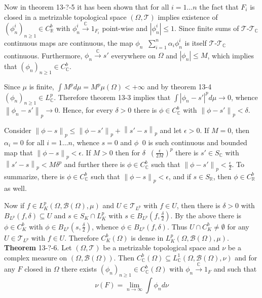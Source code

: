 \documentclass[a4paper]{article}
\newcommand{\brac}[1]{\left ( #1 \right )}
\newcommand{\abs}[1]{\left | #1 \right |}
\newcommand{\nrm}[1]{\left\| #1 \right \|}
\newcommand{\Real}{\mathbb{R}}
\newcommand{\Cplx}{\mathbb{C}}
\newcommand{\Tcal}{\mathcal{T}}
\newcommand{\borel}[1]{\mathcal{B}\brac{#1}}
\newcommand{\defn}{\mathop{\overset{\Delta}{=}}\nolimits}
\begin{document}
Now in theorem 13-?-5 it has been shown that for all $i=1\ldots n$ the fact that $F_i$ is closed in a metrizable topological space $\brac{\Omega,\Tcal}$ implies existence of $\brac{\phi^i_n}_{n\geq1}\in C^b_\Real$ with $\phi^i_n\overset{\Cplx}{\to}1_{F_i}$ point-wise and $\abs{\phi^i_n}\leq 1$. Since finite sums of $\Tcal$-$\Tcal_\Cplx$ continuous maps are continuous, the map $\phi_n\defn \sum_{i=1}^n \alpha_i \phi^i_n$ is itself $\Tcal$-$\Tcal_\Cplx$ continuous. Furthermore, $\phi_n\overset{\Cplx}{\to}s'$ everywhere on $\Omega$ and $\abs{\phi_n}\leq M$, which implies that $\brac{\phi_n}_{n\geq1}\in C^b_\Cplx$.

Since $\mu$ is finite, $\int M^p d\mu = M^p \mu\brac{\Omega}<+\infty$ and by theorem 13-4 $\brac{\phi_n}_{n\geq1}\in L^p_\Cplx$. Therefore theorem 13-3 implies that $\int \abs{\phi_n-s'}^p d\mu \to 0$, whence $\nrm{\phi_n-s'}_p\to 0$. Hence, for every $\delta>0$ there is $\phi\in C^b_\Cplx$ with $\nrm{\phi-s'}_p<\delta$.

Consider $\nrm{\phi-s}_p\leq \nrm{\phi-s'}_p+\nrm{s'-s}_p$ and let $\epsilon>0$. If $M=0$, then $\alpha_i=0$ for all $i=1\ldots n$, whence $s=0$ and $\phi\defn 0$ is such continuous and bounded map that $\nrm{\phi-s}_p<\epsilon$. If $M>0$ then for $\delta\defn \brac{\frac{\epsilon}{2 M}}^p$ there is $s'\in S_\Cplx$ with $\nrm{s'-s}_p< M \delta^p$ and further there is $\phi\in C^b_\Cplx$ such that $\nrm{\phi-s'}_p<\frac{\epsilon}{2}$. To summarize, there is $\phi\in C^b_\Cplx$ such that $\nrm{\phi-s}_p<\epsilon$, and if $s\in S_\Real$, then $\phi\in C^b_\Real$ as well.

Now if $f\in L^p_K\brac{\Omega,\borel{\Omega},\mu}$ and $U\in \Tcal_{L^p}$ with $f\in U$, then there is $\delta>0$ with $B_{L^p}\brac{f,\delta}\subseteq U$ and $s\in S_K\cap L^p_K$ with $s\in B_{L^p}\brac{f,\frac{\delta}{2}}$. By the above there is $\phi\in C^b_K$ with $\phi\in B_{L^p}\brac{s,\frac{\delta}{2}}$, whence $\phi\in B_{L^p}\brac{f,\delta}$. Thus $U\cap C^b_K \neq \emptyset$ for any $U\in \Tcal_{L^p}$ with $f\in U$. Therefore $C^b_K\brac{\Omega}$ is dense in $L^p_K\brac{\Omega,\borel{\Omega},\mu}$.\\

\label{thm:cplx_meas_cb_prrox}\noindent\textbf{Theorem} 13-?-6.
Let $\brac{\Omega,\Tcal}$ be a metrizable topological space and $\nu$ be a complex measure on $\brac{\Omega, \borel{\Omega}}$. Then $C^b_\Cplx\brac{\Omega}\subseteq L^1_\Cplx\brac{\Omega, \borel{\Omega}, \nu}$ and for any $F$ closed in $\Omega$ there exists $\brac{\phi_n}_{n\geq1}\in C^b_\Cplx\brac{\Omega}$ with $\phi_n\overset{\Cplx}{\to} 1_F$ and such that \[\nu\brac{F} = \lim_{n\to \infty}\int \phi_n d\nu\]
\end{document}
